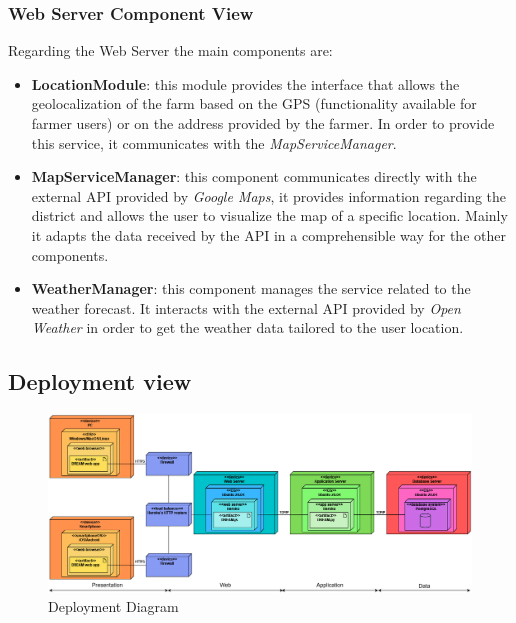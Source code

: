 \documentclass[table, 12pt]{article}
\begin{document}
\subsubsection*{Web Server Component View}
Regarding the Web Server the main components are:
\begin{itemize}
    \item \textbf{LocationModule}: this module provides the interface that allows the geolocalization of the farm based on the GPS (functionality available for farmer users) or on the address provided by the farmer.
    In order to provide this service, it communicates with the \textit{MapServiceManager}.
    \item \textbf{MapServiceManager}: this component communicates directly with the external API provided by \textit{Google Maps}, it provides information regarding the district and allows the user to visualize the map of a specific location.
    Mainly it adapts the data received by the API in a comprehensible way for the other components.
    \item \textbf{WeatherManager}: this component manages the service related to the weather forecast.
    It interacts with the external API provided by \textit{Open Weather} in order to get the weather data tailored to the user location.
\end{itemize}

\newpage
\subsection{Deployment view}
\begin{center}
    \begin{figure}[H]
        \includegraphics[scale=0.45, center]{assets/deployment_diagram.png}
        \caption{Deployment Diagram}
        \label{fig: deployment_diagram}
    \end{figure}
\end{center}
\end{document}
